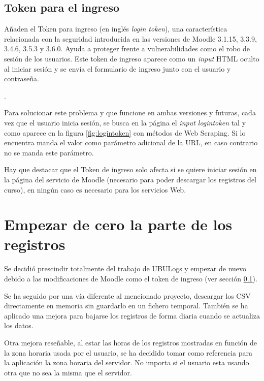 \subsection{Token para el ingreso} \label{sec:logintoken}
Añaden el Token para ingreso\cite{noauthor_token_nodate} (en inglés \textit{login token}), una característica relacionada con la seguridad introducida en las versiones de Moodle 3.1.15, 3.3.9, 3.4.6, 3.5.3 y 3.6.0. Ayuda a proteger frente a vulnerabilidades como el robo de sesión de los usuarios. Este token de ingreso aparece como un \textit{input} HTML oculto\cite{noauthor_html_nodate-1} al iniciar sesión y se envía el formulario de ingreso junto con el usuario y contraseña.

.

Para solucionar este problema y que funcione en ambas versiones y futuras, cada vez que el usuario inicia sesión, se busca en la página el \textit{input logintoken} tal y como aparece en la figura \ref{fig:logintoken} con métodos de Web Scraping\cite{marti_que_2016}. Si lo encuentra manda el valor como parámetro adicional de la URL, en caso contrario no se manda este parámetro.

Hay que destacar que el Token de ingreso solo afecta si se quiere iniciar sesión en la página del servicio de Moodle (necesario para poder descargar los registros del curso), en ningún caso es necesario para los servicios Web.

\section{Empezar de cero la parte de los registros}

Se decidió prescindir totalmente del trabajo de UBULogs y empezar de nuevo debido a las modificaciones de Moodle como el token de ingreso (ver sección \ref{sec:logintoken}). 

Se ha seguido por una vía diferente al mencionado proyecto, descargar los CSV directamente en memoria sin guardarlo en un fichero temporal. También se ha aplicado una mejora para bajarse los registros de forma diaria cuando se actualiza los datos.

Otra mejora reseñable, al estar las horas de los registros mostradas en función de la zona horaria usada por el usuario, se ha decidido tomar como referencia para la aplicación la zona horaria del servidor. No importa si el usuario esta usando otra que no sea la misma que el servidor.

